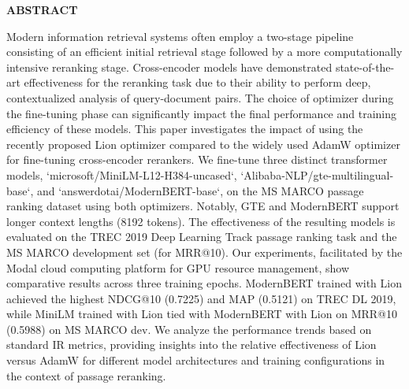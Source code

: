 \begin{center}
    {\large\bfseries ABSTRACT}
\end{center}
\begin{spacing}{1.5}
     Modern information retrieval systems often employ a two-stage pipeline consisting of an efficient initial retrieval stage followed by a more computationally intensive reranking stage. Cross-encoder models have demonstrated state-of-the-art effectiveness for the reranking task due to their ability to perform deep, contextualized analysis of query-document pairs. The choice of optimizer during the fine-tuning phase can significantly impact the final performance and training efficiency of these models. This paper investigates the impact of using the recently proposed Lion optimizer compared to the widely used AdamW optimizer for fine-tuning cross-encoder rerankers. We fine-tune three distinct transformer models, `microsoft/MiniLM-L12-H384-uncased`, `Alibaba-NLP/gte-multilingual-base`, and `answerdotai/ModernBERT-base`, on the MS MARCO passage ranking dataset using both optimizers. Notably, GTE and ModernBERT support longer context lengths (8192 tokens). The effectiveness of the resulting models is evaluated on the TREC 2019 Deep Learning Track passage ranking task and the MS MARCO development set (for MRR@10). Our experiments, facilitated by the Modal cloud computing platform for GPU resource management, show comparative results across three training epochs. ModernBERT trained with Lion achieved the highest NDCG@10 (0.7225) and MAP (0.5121) on TREC DL 2019, while MiniLM trained with Lion tied with ModernBERT with Lion on MRR@10 (0.5988) on MS MARCO dev. We analyze the performance trends based on standard IR metrics, providing insights into the relative effectiveness of Lion versus AdamW for different model architectures and training configurations in the context of passage reranking.
\end{spacing}


\newpage


\tableofcontents %
\listoffigures
\listoftables

